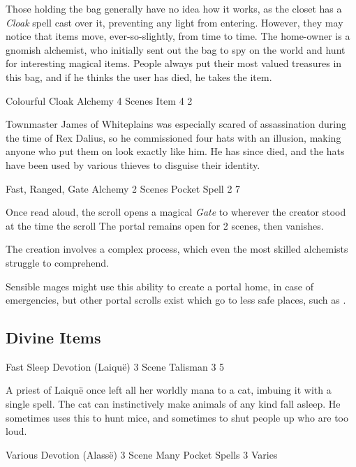 \begin{multicols}{2}
Those holding the bag generally have no idea how it works, as the closet has a \textit{Cloak} spell cast over it, preventing any light from entering.
However, they may notice that items move, ever-so-slightly, from time to time.
The home-owner is a gnomish alchemist, who initially sent out the bag to spy on the world and hunt for interesting magical items.
People always put their most valued treasures in this bag, and if he thinks the user has died, he takes the item.

  {Colourful Cloak}%
  {Alchemy}%
  {4 Scenes}%
  {Item}%
  {4}%
  {2}%

Townmaster James of Whiteplains was especially scared of assassination during the time of Rex Dalius, so he commissioned four hats with an illusion, making anyone who put them on look exactly like him.
He has since died, and the hats have been used by various thieves to disguise their identity.

  {Fast, Ranged, Gate}%
  {Alchemy}%
  {2 Scenes}%
  {Pocket Spell}%
  {2}%
  {7}%

\label{portalscroll}

Once read aloud, the scroll opens a magical \textit{Gate} to wherever the creator stood at the time the scroll 
The portal remains open for 2 scenes, then vanishes.

The creation involves a complex process, which even the most skilled alchemists struggle to comprehend.

Sensible mages might use this ability to create a portal home, in case of emergencies, but other portal scrolls exist which go to less safe places, such as .

\subsection{Divine Items}

  {Fast Sleep}%
  {Devotion (Laiqu\"{e})}%
  {3 Scene}%
  {Talisman}%
  {3}%
  {5}%

A priest of Laiqu\"{e} once left all her worldly mana to a cat, imbuing it with a single spell.
The cat can instinctively make animals of any kind fall asleep.
He sometimes uses this to hunt mice, and sometimes to shut people up who are too loud.

\ifodd\month\else
{}%
  {Various}%
  {Devotion (Alass\"{e})}%
  {3 Scene}%
  {Many Pocket Spells}%
  {3}%
  {Varies}\label{deckofmanythings}%


\end{multicols}
